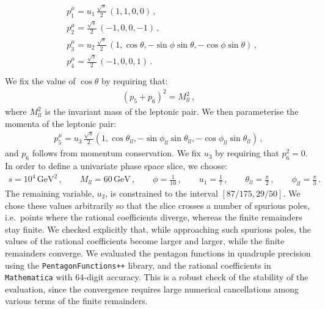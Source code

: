 \documentclass[main.tex]{subfiles}
\begin{document}
\begin{align} \label{Wyjeq:unislice1}
\begin{aligned}
& p_1^{\mu} = u_1 \, \frac{\sqrt{s}}{2} \, \left(1,1,0,0 \right) \,, \\
& p_2^{\mu} =  \frac{\sqrt{s}}{2} \, \left(-1,0,0,-1 \right) \,, \\
& p_3^{\mu} = u_2 \, \frac{\sqrt{s}}{2} \, \left(1,\cos\theta,-\sin \phi \sin \theta, -\cos \phi \sin\theta \right) \,, \\
& p_4^{\mu} =  \frac{\sqrt{s}}{2} \, \left(-1,0,0,1 \right) \,. \\
\end{aligned}
\end{align}
We fix the value of $\cos\theta$ by requiring that: 
\begin{align} \label{Wyjeq:unislice2}
(p_5+p_6)^2 = M^2_{ll} \,, 
\end{align}
where $M^2_{ll}$ is the invariant mass of the leptonic pair.
We then parameterise the momenta of the leptonic pair:
\begin{align} \label{Wyjeq:unislice3}
p_5^{\mu} = u_3 \, \frac{\sqrt{s}}{2}  \left(1,\cos\theta_{ll},-\sin \phi_{ll} \sin \theta_{ll}, -\cos \phi_{ll} \sin\theta_{ll} \right) \,,
\end{align}
and $p_6$ follows from momentum conservation.
We fix $u_3$ by requiring that $p_6^2 = 0$. In order to define a univariate phase space slice, we choose:
\begin{align} \label{Wyjeq:unisliceparams}
s = 10^4 \, \text{GeV}^2 \,, \qquad M_{ll} = 60 \, \text{GeV}  \,, \qquad \phi = \frac{1}{10} \,, \qquad u_1 = \frac{1}{7}\,, \qquad \theta_{ll} = \frac{\pi}{2} \,, \qquad \phi_{ll} = \frac{\pi}{3} \,.
\end{align}
The remaining variable, $u_2$, is constrained to the interval $[87/175, 29/50]$. We chose these values arbitrarily so that the slice crosses a number of spurious poles, i.e.\ points where the rational coefficients diverge, whereas the finite remainders stay finite. We checked explicitly that, while approaching such spurious poles, the values of the rational coefficients become larger and larger, while the finite remainders converge. 
We evaluated the pentagon functions in quadruple precision using the \texttt{PentagonFunctions++} library, and the rational coefficients in \texttt{Mathematica} with $64$-digit accuracy.
This is a robust check of the stability of the evaluation, since the convergence requires large numerical cancellations among various terms of the finite remainders. 
\end{document}
